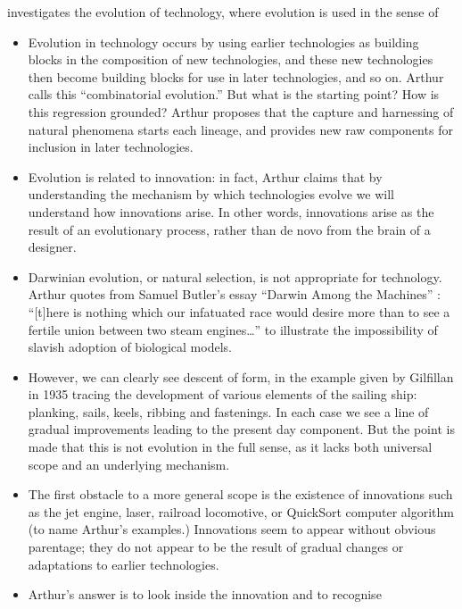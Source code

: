\autocite{Arthur2009} investigates the evolution of
technology, where evolution is used in the sense of 
\begin{itemize}
	
	\item
	Evolution in technology occurs by using earlier technologies as
	building blocks in the composition of new technologies, and these new
	technologies then become building blocks for use in later
	technologies, and so on. Arthur calls this ``combinatorial
	evolution.'' But what is the starting point? How is this regression
	grounded? Arthur proposes that the capture and harnessing of natural
	phenomena starts each lineage, and provides new raw components for
	inclusion in later technologies.
	\item
	Evolution is related to innovation: in fact, Arthur claims that by
	understanding the mechanism by which technologies evolve we will
	understand how innovations arise. In other words, innovations arise
	as the result of an evolutionary process, rather than de novo from
	the brain of a designer.
	\item
	Darwinian evolution, or natural selection, is not appropriate for
	technology. Arthur quotes from Samuel Butler's essay ``Darwin Among
	the Machines'' : ``{[}t{]}here is nothing which our infatuated race
	would desire more than to see a fertile union between two steam
	engines\ldots{}'' to illustrate the impossibility of slavish
	adoption of biological models.
	\item
	However, we can clearly see descent of form, in the example given by
	Gilfillan in 1935 tracing the development of various elements of the
	sailing ship: planking, sails, keels, ribbing and fastenings. In
	each case we see a line of gradual improvements leading to the
	present day component. But the point is made that this is not
	evolution in the full sense, as it lacks both universal scope and an
	underlying mechanism.
	\item
	The first obstacle to a more general scope is the existence of
	innovations such as the jet engine, laser, railroad locomotive, or
	QuickSort computer algorithm (to name Arthur's examples.)
	Innovations seem to appear without obvious parentage; they do not
	appear to be the result of gradual changes or adaptations to earlier
	technologies.
	\item
	Arthur's answer is to look inside the innovation and to recognise

\end{itemize}
